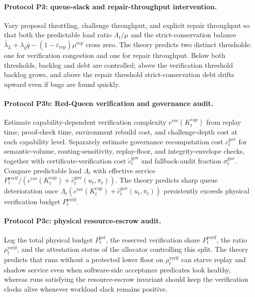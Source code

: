 \documentclass[11pt]{article}
\theoremstyle{definition}
\newcommand{\1}{\mathbf{1}}
\newcommand{\eps}{\varepsilon}
\begin{document}
\paragraph{Protocol P3: queue-slack and repair-throughput intervention.} Vary proposal throttling, challenge throughput, and explicit repair throughput so that both the predictable load ratio $\Lambda_t/\mu$ and the strict-conservation balance $\bar\lambda_L+\lambda_q\bar q-(1-\eps_{\mathrm{rep}})\mu^{\mathrm{rep}}$ cross zero. The theory predicts two distinct thresholds: one for verification congestion and one for repair throughput. Below both thresholds, backlog and debt are controlled; above the verification threshold backlog grows, and above the repair threshold strict-conservation debt drifts upward even if bugs are found quickly.

\paragraph{Protocol P3b: Red-Queen verification and governance audit.} Estimate capability-dependent verification complexity $c^{\mathrm{ver}}(K_t^{\mathrm{cap}})$ from replay time, proof-check time, environment rebuild cost, and challenge-depth cost at each capability level. Separately estimate governance recomputation cost $c_t^{\mathrm{gov}}$ for semantic-volume, routing-sensitivity, replay-floor, and integrity-envelope checks, together with certificate-verification cost $\widetilde c_t^{\mathrm{gov}}$ and fallback-audit fraction $\sigma_t^{\mathrm{gov}}$. Compare predictable load $\Lambda_t$ with effective service $P_t^{\mathrm{verif}}/(c^{\mathrm{ver}}(K_t^{\mathrm{cap}})+\widehat c_t^{\mathrm{gov}}(u_t,\pi_t))$. The theory predicts sharp queue deterioration once $\Lambda_t(c^{\mathrm{ver}}(K_t^{\mathrm{cap}})+\widehat c_t^{\mathrm{gov}}(u_t,\pi_t))$ persistently exceeds physical verification budget $P_t^{\mathrm{verif}}$.

\paragraph{Protocol P3c: physical resource-escrow audit.} Log the total physical budget $P_t^{\mathrm{tot}}$, the reserved verification share $P_t^{\mathrm{verif}}$, the ratio $\rho_t^{\mathrm{verif}}$, and the attestation status of the allocator controlling this split. The theory predicts that runs without a protected lower floor on $\rho_t^{\mathrm{verif}}$ can starve replay and shadow service even when software-side acceptance predicates look healthy, whereas runs satisfying the resource-escrow invariant should keep the verification clocks alive whenever workload slack remains positive.
\end{document}
